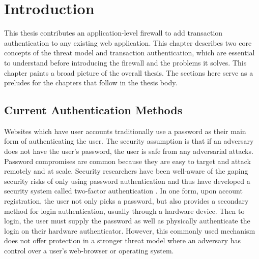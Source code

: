 \chapter{Introduction}

This thesis contributes an application-level firewall to add transaction authentication to any existing web application. This chapter describes two core concepts of the threat model and transaction authentication, which are essential to understand before introducing the firewall and the problems it solves. This chapter paints a broad picture of the overall thesis. The sections here serve as a preludes for the chapters that follow in the thesis body.





\section{Current Authentication Methods}

Websites which have user accounts traditionally use a password as their main form of authenticating the user. The security assumption is that if an adversary does not have the user's password, the user is safe from any adversarial attacks. Password compromises are common \cite{questRemovePasswords} because they are easy to target and attack remotely and at scale. Security researchers have been well-aware of the gaping security risks of only using password authentication and thus have developed a security system called two-factor authentication \cite{2FA}. In one form, upon account registration, the user not only picks a password, but also provides a secondary method for login authentication, usually through a hardware device. Then to login, the user must supply the password as well as physically authenticate the login on their hardware authenticator. However, this commonly used mechanism does not offer protection in a stronger threat model where an adversary has control over a user's web-browser or operating system. 

